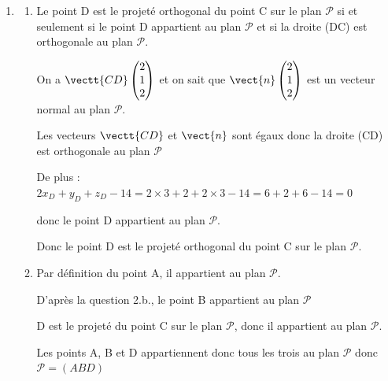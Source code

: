 \begin{enumerate}
\begin{enumerate}
			Une équation cartésienne de $\mathcal{P}$ est donc bien :   $2x + y + 2z - 14 = 0$.
			\item  Un point appartient à un plan si et seulement si ses coordonnées vérifient une équation de ce plan.

			$2x_B+y_B+z_B-14 = 2 \times 5 -2 +2 \times 3 -14 =10-2+6-14 =0 $ 

			donc le point B appartient au plan $\mathcal{P}$.
			
			$2x_C+y_C+z_C-14 = 2 \times 1 +1 +2 \times 1 -14 = 2+1+2-14=-9 \neq 0 $ 
			
			donc le point C n'appartient pas au plan $\mathcal{P}$. 
			
		\end{enumerate}
		\item 
		\begin{enumerate}
			\item    Le point D est le projeté orthogonal du point C sur le plan $\mathcal{P}$ si et seulement si le point D appartient au plan $\mathcal{P}$ et si la droite (DC) est orthogonale au plan $\mathcal{P}$.

On a $\vectt{CD} \begin{pmatrix} 2\\1\\2  \end{pmatrix}$ et on sait que $\vect{n}\begin{pmatrix} 2 \\1\\2 \end{pmatrix}$ est un vecteur normal au plan $\mathcal{P}$.

Les vecteurs $\vectt{CD}$ et $\vect{n}$ sont égaux donc la droite (CD) est orthogonale au plan $\mathcal{P}$

De plus : $2x_D+y_D+z_D-14 = 2 \times 3 +2 +2 \times 3 -14 =6 +2+6-14 =0 $

donc le point D appartient au plan $\mathcal{P}$.

Donc le point D est le projeté orthogonal du point C sur le plan $\mathcal{P}$.
	\item  Par définition du point A, il appartient au plan $\mathcal{P}$. 

D'après la question 2.b., le point B appartient au plan $\mathcal{P}$

D est le projeté du point C sur le plan $\mathcal{P}$, donc il appartient au plan $\mathcal{P}$.

Les points A, B  et D  appartiennent donc tous les trois au plan $\mathcal{P}$  donc $\mathcal{P} = (ABD)$
	

\end{enumerate}
\end{enumerate}
